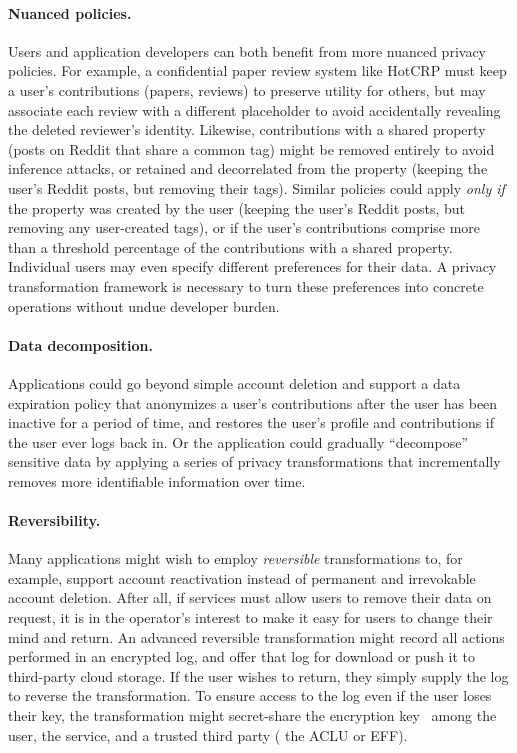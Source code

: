 \paragraph{Nuanced policies.}
%
Users and application developers can both benefit from more nuanced privacy policies.
%
For example, a confidential paper review system like HotCRP must keep a user's contributions
(papers, reviews) to preserve utility for others, but may associate each review with a different
placeholder to avoid accidentally revealing the deleted reviewer's identity.
%
Likewise, contributions with a shared property (\eg posts on Reddit that share a common tag)
might be removed entirely to avoid inference attacks, or retained and decorrelated from the
property (\eg keeping the user's Reddit posts, but removing their tags).
%
Similar policies could apply \emph{only if} the property was created by the user (\eg keeping
the user's Reddit posts, but removing any user-created tags), or if the user's contributions
comprise more than a threshold percentage of the contributions with a shared property.
%
Individual users may even specify different preferences for their data.
%
A privacy transformation framework is necessary to turn these preferences into concrete
operations without undue developer burden.
%

\paragraph{Data decomposition.}
%
Applications could go beyond simple account deletion and support a data expiration policy that
anonymizes a user's contributions after the user has been inactive for a period of time, and
restores the user's profile and contributions if the user ever logs back in.
%
Or the application could gradually ``decompose'' sensitive data by applying a series of
privacy transformations that incrementally removes more identifiable information over time.
%

\paragraph{Reversibility.}
%
Many applications might wish to employ \emph{reversible} transformations to, for example, support
account reactivation instead of permanent and irrevokable account deletion.
%
After all, if services must allow users to remove their data on request, it is in the operator's
interest to make it easy for users to change their mind and return.
%
An advanced reversible transformation might record all actions performed in an encrypted log, and
offer that log for download or push it to third-party cloud storage.
%
If the user wishes to return, they simply supply the log to reverse the transformation.
%
To ensure access to the log even if the user loses their key, the transformation might secret-share
the encryption key~\cite{secretsharing} among the user, the service, and a trusted third party (\eg
the ACLU or EFF).
%
